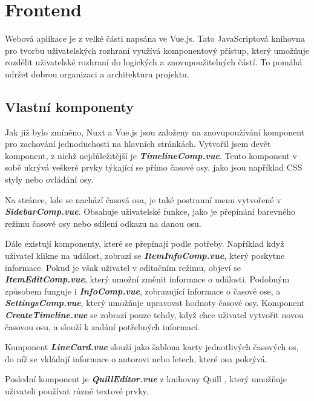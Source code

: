 \section{Frontend}

Webová aplikace je z velké části napsána ve Vue.js. Tato JavaScriptová knihovna pro tvorbu uživatelských rozhraní využívá komponentový přístup, který umožňuje rozdělit uživatelské rozhraní do logických a znovupoužitelných částí. To pomáhá udržet dobrou organizaci a architekturu projektu.

\subsection{Vlastní komponenty}
Jak již bylo zmíněno, Nuxt a Vue.js jsou založeny na znovupoužívání komponent pro zachování jednoduchosti na hlavních stránkách. Vytvořil jsem devět komponent, z nichž nejdůležitější je \textbf{\textit{TimelineComp.vue}}. Tento komponent v sobě ukrývá veškeré prvky týkající se přímo časové osy, jako jsou například CSS styly nebo ovládání osy.

Na stránce, kde se nachází časová osa, je také postranní menu vytvořené v \textbf{\textit{SidebarComp.vue}}. Obsahuje uživatelské funkce, jako je přepínání barevného režimu časové osy nebo sdílení odkazu na danou osu.

Dále existují komponenty, které se přepínají podle potřeby. Například když uživatel klikne na událost, zobrazí se \textbf{\textit{ItemInfoComp.vue}}, který poskytne informace. Pokud je však uživatel v editačním režimu, objeví se \textbf{\textit{ItemEditComp.vue}}, který umožní změnit informace o události. Podobným způsobem funguje i \textbf{\textit{InfoComp.vue}}, zobrazující informace o časové ose, a \textbf{\textit{SettingsComp.vue}}, který umožňuje upravovat hodnoty časové osy. Komponent \textbf{\textit{CreateTimeline.vue}} se zobrazí pouze tehdy, když chce uživatel vytvořit novou časovou osu, a slouží k zadání potřebných informací.

Komponent \textbf{\textit{LineCard.vue}} slouží jako šablona karty jednotlivých časových os, do níž se vkládají informace o autorovi nebo letech, které osa pokrývá.

Poslední komponent je \textbf{\textit{QuillEditor.vue}} z knihovny Quill \cite{Quill-lib}, který umožňuje uživateli používat různé textové prvky.

\newpage

